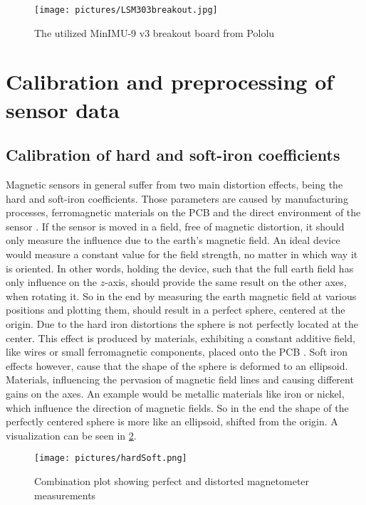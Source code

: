 \begin{figure}
\centering
\texttt{[image: pictures/LSM303breakout.jpg]}
\caption{The utilized MinIMU-9 v3 breakout board from Pololu \cite{pol2016}}
\label{fig:breakout}
\end{figure}


\section{Calibration and preprocessing of sensor data} \label{sec:caliPrepro}

\subsection{Calibration of hard and soft-iron coefficients} \label{subsec:hardSoft}

Magnetic sensors in general suffer from two main distortion effects, being the hard and soft-iron coefficients. Those parameters are caused by manufacturing processes, ferromagnetic materials on the \ac{PCB} and the direct environment of the sensor \cite{ozyagcilar2012calibrating}. If the sensor is moved in a field, free of magnetic distortion, it should only measure the influence due to the earth's magnetic field. An ideal device would measure a constant value for the field strength, no matter in which way it is oriented. In other words, holding the device, such that the full earth field has only influence on the $ z $-axis, should provide the same result on the other axes, when rotating it. So in the end by measuring the earth magnetic field at various positions and plotting them, should result in a perfect sphere, centered at the origin. Due to the hard iron distortions the sphere is not perfectly located at the center. This effect is produced by materials, exhibiting a constant additive field, like wires or small ferromagnetic components, placed onto the PCB \cite{konv2009}. Soft iron effects however, cause that the shape of the sphere is deformed to an ellipsoid. Materials, influencing the pervasion of magnetic field lines and causing different gains on the axes. An example would be metallic materials like iron or nickel, which influence the direction of magnetic fields. So in the end the shape of the perfectly centered sphere is more like an ellipsoid, shifted from the origin. A visualization can be seen in \ref{fig:hardSoft}.

\begin{figure}
\centering
\texttt{[image: pictures/hardSoft.png]}
\caption{Combination plot showing perfect and distorted magnetometer measurements \cite{ozyagcilar2012calibrating}}
\label{fig:hardSoft}
\end{figure}

